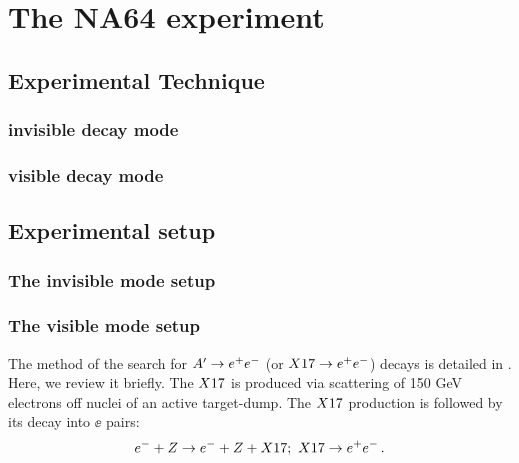 
\newcommand{\pdirtwo}{chapters/chapter2/plots}

\chapter{The NA64 experiment} %

\label{chapter2} %


\section{Experimental Technique}
\label{chapter2:sec:experimental-technique}

\subsection{invisible decay mode}
\label{chapter2:sec:experimental-technique-invis}

\subsection{visible decay mode}
\label{chapter2:sec:experimental-technique-vis}

\section{Experimental setup}
\label{chapter2:sec:experimental-setup}

\subsection{The invisible mode setup}
\label{chapter2:sec:invismode}

\subsection{The visible mode setup}
\label{chapter2:sec:vismode}

The method of the search for $A' \to e^+e^-$ (or $X17 \rightarrow e^+ e^-$) decays is detailed in \cite{Gninenko:2013rka, Andreas:2013lya, gkkk1, DMsimulation}. Here, we review it briefly. The $X17$ is produced via scattering of 150 GeV electrons off nuclei of an active target-dump. The $X17$ production is followed by its decay into $\ee$ pairs:
\begin{equation}
e^- + Z \to e^- + Z + X17   ;~ X17\to e^+e^- \,.
\label{ea}
\end{equation}


